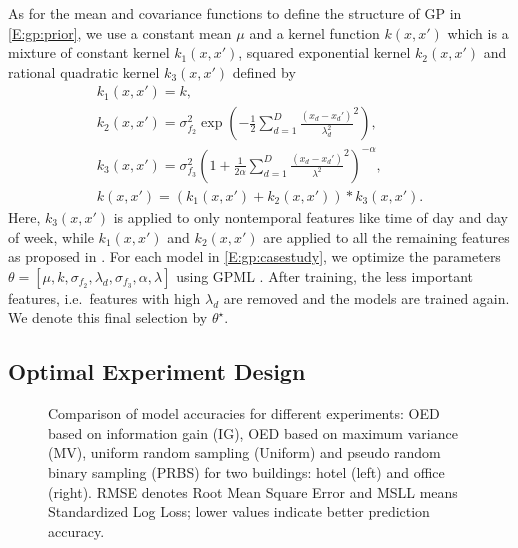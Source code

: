 As for the mean and covariance functions to define the structure of GP in \eqref{E:gp:prior}, we use a constant mean \(\mu\) and a kernel function \(k(x,x')\) which is a mixture of constant kernel \(k_1(x,x')\), squared exponential kernel \(k_2(x,x')\) and rational quadratic kernel \(k_3(x,x')\) defined by
\begin{gather}
k_1(x,x')  = k, \nonumber\\
k_2(x,x') = \sigma_{f_2}^2 \exp \left( -\frac{1}{2} \sum_{d=1}^D \frac{(x_d-x_d')}{{\lambda_d^2}}^2 \right),
 \nonumber\\
 k_3(x,x') = \sigma_{f_3}^2  \left( 1+ \frac{1}{2\alpha} \sum_{d=1}^D \frac{(x_d-x_d')}{{\lambda^2}}^2 \right)^{-\alpha},  \nonumber\\
k(x,x') = \left(k_1(x,x') + k_2(x,x')\right)*k_3(x,x').
\end{gather}
Here, \(k_3(x,x')\) is applied to only nontemporal features like time of day and day of week, while \(k_1(x,x')\) and \(k_2(x,x')\) are applied to all the remaining features as proposed in \cite{nghiemetal16gp}. For each model in \eqref{E:gp:casestudy}, we optimize the parameters \(\theta = [\mu, k, \sigma_{f_2}, \lambda_d, \sigma_{f_3}, \alpha, \lambda] \) using GPML \cite{Rasmussen2010}. After training, the less important features, i.e.~features with high \(\lambda_d\) are removed and the models are trained again. We denote this final selection by \(\theta^\star\).


\subsection{Optimal Experiment Design}

\begin{figure*}[t]
	\centering
	\setlength{}
	\setlength{}
	
	
	\caption{Comparison of model accuracies for different experiments: OED based on information gain (IG),  OED based on maximum variance (MV), uniform random sampling (Uniform) and pseudo random binary sampling (PRBS) for two buildings: hotel (left) and office (right). RMSE denotes Root Mean Square Error and MSLL means Standardized Log Loss; lower values indicate better prediction accuracy.}
	\captionsetup{justification=centering}
	\label{F:casestudy:oed}
\end{figure*}

